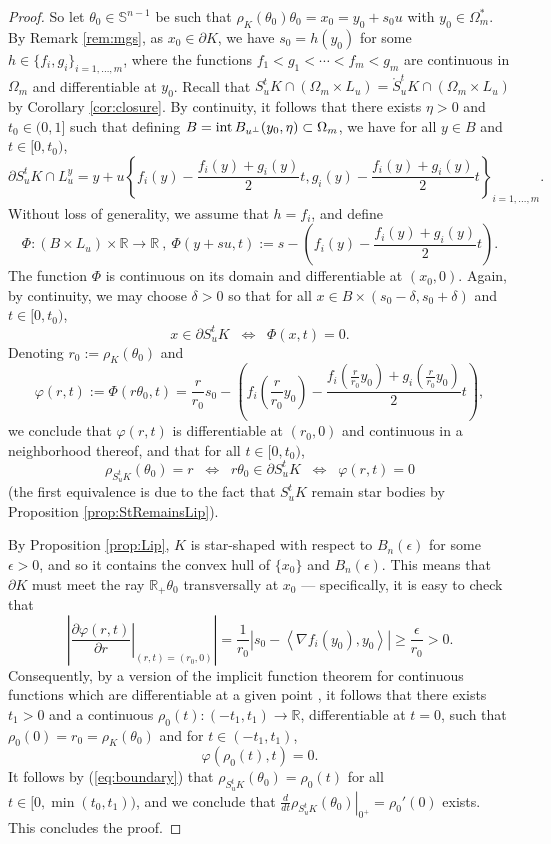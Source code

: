 \documentclass[11pt]{article}
\theoremstyle{definition}
\theoremstyle{proof}
\newcommand{\dt}[1]{\left . \frac{d}{dt} #1 \right |_{0^+}}
\DeclareMathOperator{\+}{\mathop{\tilde{+}}}
\DeclareMathOperator{\interior}{\textnormal{int}}
\newcommand{\abs}[1]{\left\vert#1\right\vert}
\newcommand{\set}[1]{\left\{#1\right\}}
\newcommand{\brac}[1]{\left(#1\right)}
\newcommand{\scalar}[1]{\left \langle #1 \right \rangle}
\newcommand{\R}{\mathbb{R}}
\renewcommand{\S}{\mathbb{S}}
\newcommand{\eps}{\epsilon}
\numberwithin{equation}{section}
\numberwithin{equation}{section}
\begin{document}
\begin{proof}
So let $\theta_0 \in \S^{n-1}$ be such that $\rho_K(\theta_0) \theta_0 = x_0 = y_0 + s_0 u$ with $y_0 \in \Omega^*_m$. By Remark \ref{rem:mgs}, as $x_0 \in \partial K$, we have $s_0 = h(y_0)$ for some $h \in \{ f_i,g_i \}_{i=1,\ldots,m}$, where the functions $f_1 < g_1 < \cdots < f_m < g_m$ are continuous in $\Omega_m$ and differentiable at $y_0$. Recall that $S_u^t K \cap (\Omega_m \times L_u) = \mathring S_u^t K \cap (\Omega_m \times L_u)$ by Corollary \ref{cor:closure}. By continuity, it follows that there exists $\eta > 0$ and $t_0 \in (0,1]$ such that defining $B = \interior B_{u^{\perp}}(y_0,\eta) \subset \Omega_m$, we have for all $y \in B$ and $t \in [0,t_0)$,
\[
\partial S_u^t K \cap L^y_u = y + u \set{ f_i(y) - \frac{f_i(y) + g_i(y)}{2} t , g_i(y) - \frac{f_i(y) + g_i(y)}{2} t  }_{i=1,\ldots,m} .
\]
Without loss of generality, we assume that $h = f_i$, and define
\[
\Phi : (B \times L_u)  \times \R \rightarrow \R ~,~ \Phi(y + s u , t) := s - \brac{ f_i(y) - \frac{f_i(y) + g_i(y)}{2} t } . 
\]
The function $\Phi$ is continuous on its domain and differentiable at $(x_0,0)$. Again, by continuity, we may choose $\delta > 0$ so that for all $x \in B \times (s_0-\delta,s_0+\delta)$ and $t \in [0,t_0)$,
\[
x \in \partial S_u^t K \;\; \Leftrightarrow \;\; \Phi(x,t) = 0  .
\]
Denoting $r_0 := \rho_K(\theta_0)$ and
\[
\varphi(r,t) := \Phi(r \theta_0 , t) = \frac{r}{r_0} s_0 - \brac{ f_i\brac{\frac{r}{r_0} y_0} - \frac{f_i(\frac{r}{r_0} y_0) + g_i(\frac{r}{r_0} y_0)}{2} t } ,
\]
we conclude that $\varphi(r,t)$ is differentiable at $(r_0,0)$ and continuous in a neighborhood thereof, and that for all $t \in [0,t_0)$,
\begin{equation} \label{eq:boundary}
\rho_{S_u^t K}(\theta_0) = r \;\; \Leftrightarrow \;\; r \theta_0 \in \partial S_u^t K \;\; \Leftrightarrow \;\; \varphi(r,t) = 0  
\end{equation}
(the first equivalence is due to the fact that $S_u^t K$ remain star bodies by Proposition \ref{prop:StRemainsLip}). 

By Proposition \ref{prop:Lip}, $K$ is star-shaped with respect to $B_n(\eps)$ for some $\eps > 0$, and so it contains the convex hull of $\{x_0\}$ and $B_n(\eps)$. This means that $\partial K$ must meet the ray $\R_+ \theta_0$ transversally at $x_0$ --- specifically, it is easy to check that
\[
\abs{\left . \frac{\partial \varphi(r,t)}{\partial r} \right |_{(r,t) = (r_0,0)}} = \frac{1}{r_0} \abs{s_0 - \scalar{\nabla f_i(y_0) , y_0} } \geq \frac{\eps}{r_0} > 0 .
\]
Consequently, by a version of the implicit function theorem for continuous functions which are differentiable at a given point \cite[Theorem E]{Halkin-ImplicitFunctionTheorems}, it follows that there exists $t_1 > 0$ and a continuous $\rho_0(t) : (-t_1,t_1) \rightarrow \R$,  differentiable at $t=0$, such that $\rho_0(0) = r_0 = \rho_K(\theta_0)$ and for $t \in (-t_1,t_1)$,
\[
\varphi(\rho_0(t),t) = 0  . 
\]
It follows by (\ref{eq:boundary}) that $\rho_{S_u^t K}(\theta_0) = \rho_0(t)$ for all $t \in [0,\min(t_0,t_1))$, and we conclude that $\dt{\rho_{S_u^t K}(\theta_0)} = \rho_0'(0)$ exists. This concludes the proof. 
\end{proof}
\end{document}
